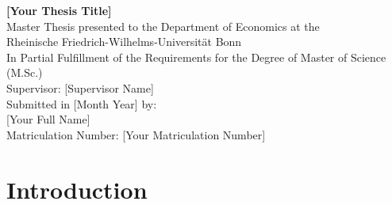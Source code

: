 \documentclass[12pt,a4paper]{article}%
\begin{document}
\begin{titlepage}
  \centering
  \vspace*{5cm}
  {\Huge \textbf{[Your Thesis Title]}}\\[2cm]
  {\large Master Thesis presented to the Department of Economics at the}\\
  {\large Rheinische Friedrich-Wilhelms-Universität Bonn}\\[1cm]
  {\large In Partial Fulfillment of the Requirements for the Degree of Master of Science (M.Sc.)}\\[2cm]
  Supervisor: [Supervisor Name] \\[0.5cm]
  Submitted in [Month Year] by: \\[0.2cm]
  [Your Full Name] \\[0.2cm]
  Matriculation Number: [Your Matriculation Number]
  \vfill
\end{titlepage}

\tableofcontents
\thispagestyle{empty}
\newpage

\setcounter{page}{1}


\section{Introduction}
\lipsum[1-2] %
\end{document}
